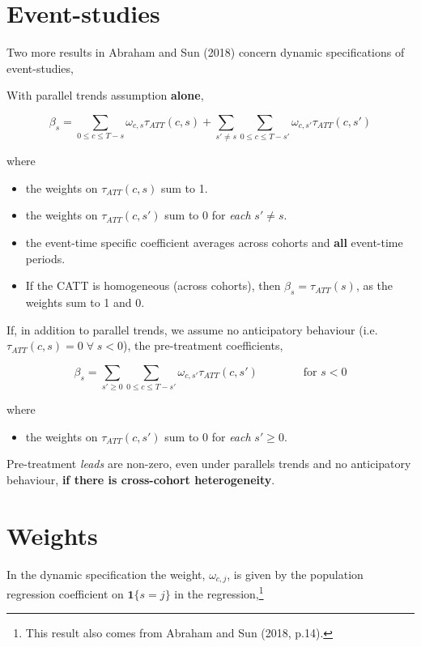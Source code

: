 \documentclass[
  letterpaper,
  DIV=11,
  numbers=noendperiod]{scrreprt}
\providecommand{\tightlist}{%
  \setlength{\itemsep}{0pt}\setlength{\parskip}{0pt}}\usepackage{longtable,booktabs,array}
\theoremstyle{definition}
\theoremstyle{remark}
\begin{document}
\hypertarget{event-studies-1}{%
\section{Event-studies}\label{event-studies-1}}

Two more results in Abraham and Sun (2018) concern dynamic
specifications of event-studies,

With parallel trends assumption \textbf{alone},

\[
\beta_s = \sum_{0\leq c \leq T-s}\omega_{c,s} \tau_{ATT}(c,s) + \sum_{s'\neq s}\sum_{0\leq c \leq T-s'}\omega_{c,s'} \tau_{ATT}(c,s')
\]

where

\begin{itemize}
\tightlist
\item
  the weights on \(\tau_{ATT}(c,s)\) sum to 1.
\item
  the weights on \(\tau_{ATT}(c,s')\) sum to 0 for \emph{each}
  \(s'\neq s\).
\item
  the event-time specific coefficient averages across cohorts and
  \textbf{all} event-time periods.
\item
  If the CATT is homogeneous (across cohorts), then
  \(\beta_s = \tau_{ATT}(s)\), as the weights sum to 1 and 0.
\end{itemize}

If, in addition to parallel trends, we assume no anticipatory behaviour
(i.e.~\(\tau_{ATT}(c,s)=0\;\forall\;s<0\)), the pre-treatment
coefficients,

\[
\beta_s = \sum_{s'\geq 0}\sum_{0\leq c \leq T-s'}\omega_{c,s'} \tau_{ATT}(c,s') \qquad\qquad \text{for }s<0
\]

where

\begin{itemize}
\tightlist
\item
  the weights on \(\tau_{ATT}(c,s')\) sum to 0 for \emph{each}
  \(s'\geq 0\).
\end{itemize}

Pre-treatment \emph{leads} are non-zero, even under parallels trends and
no anticipatory behaviour, \textbf{if there is cross-cohort
heterogeneity}.

\hypertarget{weights-1}{%
\section{Weights}\label{weights-1}}

In the dynamic specification the weight, \(\omega_{c,j}\), is given by
the population regression coefficient on \(\mathbf{1}\{s=j\}\) in the
regression,\footnote{This result also comes from Abraham and Sun (2018,
  p.14).}
\end{document}
